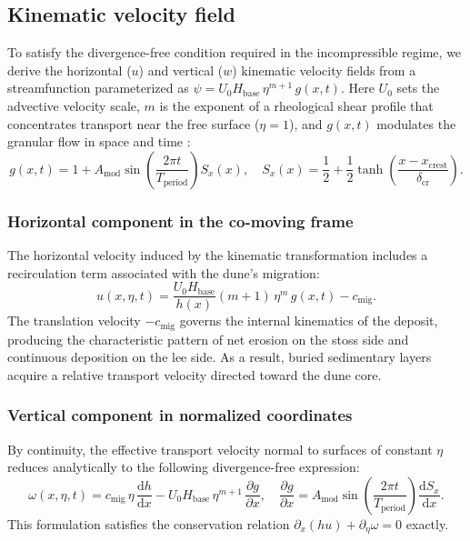 \documentclass[lineno]{JFM-FLM_Au}
\begin{document}
\subsection{Kinematic velocity field}
\label{sec:kinematic}

To satisfy the divergence-free condition required in the incompressible regime, we derive the horizontal ($u$) and vertical ($w$) kinematic velocity fields from a streamfunction parameterized as $\psi = U_0 H_{\mathrm{base}}\,\eta^{m+1}\,g(x,t)$. Here $U_0$ sets the advective velocity scale, $m$ is the exponent of a rheological shear profile that concentrates transport near the free surface ($\eta=1$), and $g(x,t)$ modulates the granular flow in space and time \citep{Tai2015}:
\begin{equation}
    g(x,t) = 1 + A_{\mathrm{mod}} \sin\!\left(\frac{2\pi t}{T_{\mathrm{period}}}\right) S_x(x), \quad
    S_x(x) = \frac{1}{2} + \frac{1}{2}\tanh\!\left(\frac{x-x_{\mathrm{crest}}}{\delta_{\mathrm{cr}}}\right).
    \label{eq:g_xt}
\end{equation}

\subsubsection{Horizontal component in the co-moving frame}
\label{sec:horizontal}

The horizontal velocity induced by the kinematic transformation includes a recirculation term associated with the dune's migration:
\begin{equation}
    u(x,\eta,t) = \frac{U_0 H_{\mathrm{base}}}{h(x)}(m+1)\,\eta^m\,g(x,t) - c_{\mathrm{mig}}.
    \label{eq:u_horizontal}
\end{equation}
The translation velocity $-c_{\mathrm{mig}}$ governs the internal kinematics of the deposit, producing the characteristic pattern of net erosion on the stoss side and continuous deposition on the lee side. As a result, buried sedimentary layers acquire a relative transport velocity directed toward the dune core.

\subsubsection{Vertical component in normalized coordinates}
\label{sec:vertical}

By continuity, the effective transport velocity normal to surfaces of constant $\eta$ reduces analytically to the following divergence-free expression:
\begin{equation}
    \omega(x,\eta,t) = c_{\mathrm{mig}}\,\eta\,\frac{\mathrm{d}h}{\mathrm{d}x} - U_0 H_{\mathrm{base}}\,\eta^{m+1}\,\frac{\partial g}{\partial x}, \quad
    \frac{\partial g}{\partial x} = A_{\mathrm{mod}} \sin\!\left(\frac{2\pi t}{T_{\mathrm{period}}}\right)\frac{\mathrm{d}S_x}{\mathrm{d}x}.
    \label{eq:w_vertical}
\end{equation}
This formulation satisfies the conservation relation $\partial_x(hu) + \partial_\eta \omega = 0$ exactly.
\end{document}
